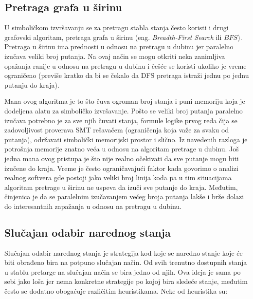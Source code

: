 \documentclass[12pt,oneside]{memoir}
\begin{document}
\bigbreak

\subsection{Pretraga grafa u širinu} \label{BFS}
U simboličkom izvršavanju se za pretragu stabla stanja često koristi i drugi grafovski algoritam, pretraga grafa u širinu (eng. \textit{Breadth-First Search} ili $BFS$). Pretraga u širinu ima prednosti u odnosu na pretragu u dubinu jer paralelno izučava veliki broj putanja. Na ovaj način se mogu otkriti neka zanimljiva opažanja ranije u odnosu na pretragu u dubinu i češće se koristi ukoliko je vreme ograničeno (previše kratko da bi se čekalo da DFS pretraga istraži jednu po jednu putanju do kraja). 

Mana ovog algoritma je to što čuva ogroman broj stanja i puni memoriju koja je dodeljena alatu za simboličko izvršavanje. Pošto se veliki broj putanja paralelno izučava potrebno je za sve njih čuvati stanja, formule logike prvog reda čija se zadovoljivost proverava SMT rešavačem (ograničenja koja važe za svaku od putanja), održavati simbolički memorijski prostor i slično. Iz navedenih razloga je potrošnja memorije znatno veća u odnosu na algoritam pretrage u dubinu. Još jedna mana ovog pristupa je što nije realno očekivati da sve putanje mogu biti izučene do kraja. Vreme je često ograničavajući faktor kada govorimo o analizi realnog softvera gde postoji jako veliki broj linija koda pa u tim situacijama algoritam pretrage u širinu ne uspeva da izuči sve putanje do kraja. Međutim, činjenica je da se paralelnim izučavanjem većeg broja putanja lakše i brže dolazi do interesantnih zapažanja u odnosu na pretragu u dubinu.

\bigbreak

\subsection{Slučajan odabir narednog stanja} 
Slučajan odabir narednog stanja je strategija kod koje se naredno stanje koje će biti obrađeno bira na potpuno slučajan način. Od svih trenutno dostupnih stanja u stablu pretarge na slučajan način se bira jedno od njih. Ova ideja je sama po sebi jako loša jer nema konkretne strategije po kojoj bira sledeće stanje, međutim često se dodatno obogaćuje različitim heuristikama. Neke od heuristika su:
\end{document}
